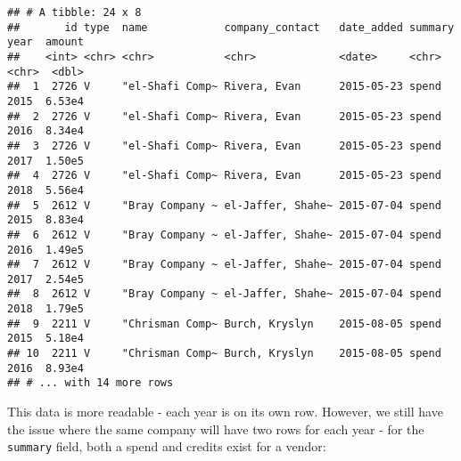 \documentclass[
]{book}
\newenvironment{Shaded}{\begin{snugshade}}{\end{snugshade}}
\newcommand{\CommentTok}[1]{\textcolor[rgb]{0.56,0.35,0.01}{\textit{#1}}}
\newcommand{\DataTypeTok}[1]{\textcolor[rgb]{0.13,0.29,0.53}{#1}}
\newcommand{\DecValTok}[1]{\textcolor[rgb]{0.00,0.00,0.81}{#1}}
\newcommand{\KeywordTok}[1]{\textcolor[rgb]{0.13,0.29,0.53}{\textbf{#1}}}
\newcommand{\NormalTok}[1]{#1}
\newcommand{\OperatorTok}[1]{\textcolor[rgb]{0.81,0.36,0.00}{\textbf{#1}}}
\newcommand{\StringTok}[1]{\textcolor[rgb]{0.31,0.60,0.02}{#1}}
\begin{document}
\begin{verbatim}
## # A tibble: 24 x 8
##       id type  name            company_contact   date_added summary year  amount
##    <int> <chr> <chr>           <chr>             <date>     <chr>   <chr>  <dbl>
##  1  2726 V     "el-Shafi Comp~ Rivera, Evan      2015-05-23 spend   2015  6.53e4
##  2  2726 V     "el-Shafi Comp~ Rivera, Evan      2015-05-23 spend   2016  8.34e4
##  3  2726 V     "el-Shafi Comp~ Rivera, Evan      2015-05-23 spend   2017  1.50e5
##  4  2726 V     "el-Shafi Comp~ Rivera, Evan      2015-05-23 spend   2018  5.56e4
##  5  2612 V     "Bray Company ~ el-Jaffer, Shahe~ 2015-07-04 spend   2015  8.83e4
##  6  2612 V     "Bray Company ~ el-Jaffer, Shahe~ 2015-07-04 spend   2016  1.49e5
##  7  2612 V     "Bray Company ~ el-Jaffer, Shahe~ 2015-07-04 spend   2017  2.54e5
##  8  2612 V     "Bray Company ~ el-Jaffer, Shahe~ 2015-07-04 spend   2018  1.79e5
##  9  2211 V     "Chrisman Comp~ Burch, Kryslyn    2015-08-05 spend   2015  5.18e4
## 10  2211 V     "Chrisman Comp~ Burch, Kryslyn    2015-08-05 spend   2016  8.93e4
## # ... with 14 more rows
\end{verbatim}

This data is more readable - each year is on its own row. However, we still have the issue where the same company will have two rows for each year - for the \texttt{summary} field, both a spend and credits exist for a vendor:

\begin{Shaded}
\end{Shaded}
\end{document}
